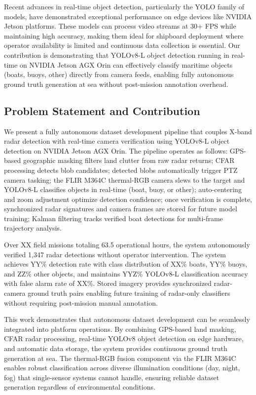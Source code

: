 \documentclass[conf]{asmeconf}
\begin{document}
Recent advances in real-time object detection, particularly the YOLO family of models, have demonstrated exceptional performance on edge devices like NVIDIA Jetson platforms. These models can process video streams at 30+ FPS while maintaining high accuracy, making them ideal for shipboard deployment where operator availability is limited and continuous data collection is essential. Our contribution is demonstrating that YOLOv8-L object detection running in real-time on NVIDIA Jetson AGX Orin can effectively classify maritime objects (boats, buoys, other) directly from camera feeds, enabling fully autonomous ground truth generation at sea without post-mission annotation overhead.

\subsection{Problem Statement and Contribution}

We present a fully autonomous dataset development pipeline that couples X-band radar detection with real-time camera verification using YOLOv8-L object detection on NVIDIA Jetson AGX Orin. The pipeline operates as follows: GPS-based geographic masking filters land clutter from raw radar returns; CFAR processing detects blob candidates; detected blobs automatically trigger PTZ camera tasking; the FLIR M364C thermal-RGB camera slews to the target and YOLOv8-L classifies objects in real-time (boat, buoy, or other); auto-centering and zoom adjustment optimize detection confidence; once verification is complete, synchronized radar signatures and camera frames are stored for future model training; Kalman filtering tracks verified boat detections for multi-frame trajectory analysis.

Over XX field missions totaling 63.5 operational hours, the system autonomously verified 1,347 radar detections without operator intervention. The system achieves YY\% detection rate with class distribution of XX\% boats, YY\% buoys, and ZZ\% other objects, and maintains YYZ\% YOLOv8-L classification accuracy with false alarm rate of XX\%. Stored imagery provides synchronized radar-camera ground truth pairs enabling future training of radar-only classifiers without requiring post-mission manual annotation.

This work demonstrates that autonomous dataset development can be seamlessly integrated into platform operations. By combining GPS-based land masking, CFAR radar processing, real-time YOLOv8 object detection on edge hardware, and automatic data storage, the system provides continuous ground truth generation at sea. The thermal-RGB fusion component via the FLIR M364C enables robust classification across diverse illumination conditions (day, night, fog) that single-sensor systems cannot handle, ensuring reliable dataset generation regardless of environmental conditions.
\end{document}
